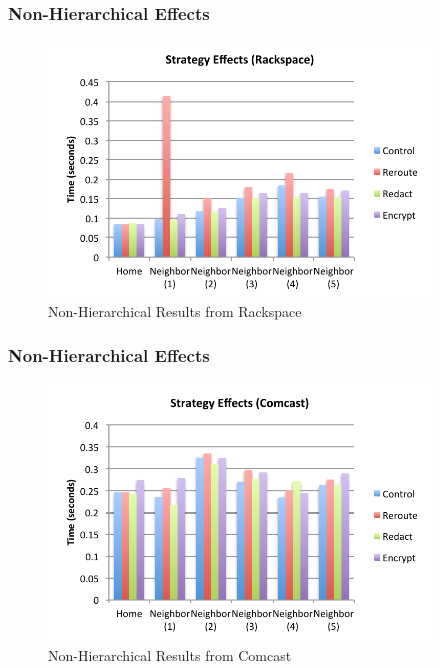 \documentclass[t,handout]{beamer}
\begin{document}
\begin{frame}
\frametitle{Non-Hierarchical Effects}
\begin{figure}[!t]
\centering
\includegraphics[width=4in]{nh_strategy_effects_rs}
\caption{Non-Hierarchical  Results from Rackspace}
\end{figure}
\end{frame}

\begin{frame}
\frametitle{Non-Hierarchical Effects}
\begin{figure}[!t]
\centering
\includegraphics[width=4in]{nh_strategy_effects_local}
\caption{Non-Hierarchical Results from Comcast}
\end{figure}
\end{frame}
\end{document}
